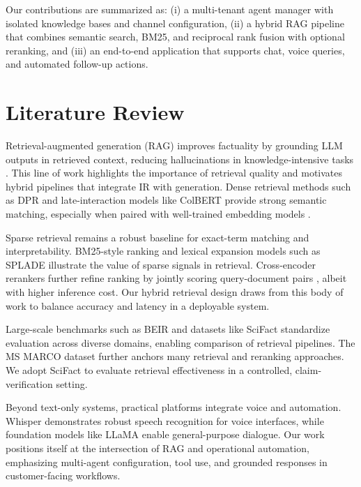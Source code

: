 \documentclass[runningheads]{llncs}
\begin{document}
    Our contributions are summarized as: (i) a multi-tenant agent manager with isolated knowledge bases and channel configuration, (ii) a hybrid RAG pipeline that combines semantic search, BM25, and reciprocal rank fusion with optional reranking, and (iii) an end-to-end application that supports chat, voice queries, and automated follow-up actions.

    \section{Literature Review}
    Retrieval-augmented generation (RAG) improves factuality by grounding LLM outputs in retrieved context, reducing hallucinations in knowledge-intensive tasks \cite{lewis2021retrievalaugmentedgenerationknowledgeintensivenlp}. This line of work highlights the importance of retrieval quality and motivates hybrid pipelines that integrate IR with generation. Dense retrieval methods such as DPR \cite{karpukhin2020densepassageretrievalopendomain} and late-interaction models like ColBERT \cite{khattab2020colbertefficienteffectivepassage} provide strong semantic matching, especially when paired with well-trained embedding models \cite{reimers2019sentencebertsentenceembeddingsusing}.

    Sparse retrieval remains a robust baseline for exact-term matching and interpretability. BM25-style ranking and lexical expansion models such as SPLADE \cite{formal2021spladev2sparselexical} illustrate the value of sparse signals in retrieval. Cross-encoder rerankers further refine ranking by jointly scoring query-document pairs \cite{nogueira2020passagererankingbert,nogueira2020documentrankingpretrainedsequencetosequence}, albeit with higher inference cost. Our hybrid retrieval design draws from this body of work to balance accuracy and latency in a deployable system.

    Large-scale benchmarks such as BEIR \cite{thakur2021beirheterogenousbenchmarkzeroshot} and datasets like SciFact \cite{wadden2020factfictionverifyingscientific} standardize evaluation across diverse domains, enabling comparison of retrieval pipelines. The MS MARCO dataset \cite{bajaj2018msmarcohumangenerated} further anchors many retrieval and reranking approaches. We adopt SciFact to evaluate retrieval effectiveness in a controlled, claim-verification setting.

    Beyond text-only systems, practical platforms integrate voice and automation. Whisper \cite{radford2022robustspeechrecognitionlargescale} demonstrates robust speech recognition for voice interfaces, while foundation models like LLaMA \cite{touvron2023llamaopenefficientfoundation} enable general-purpose dialogue. Our work positions itself at the intersection of RAG and operational automation, emphasizing multi-agent configuration, tool use, and grounded responses in customer-facing workflows.
\end{document}

